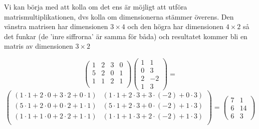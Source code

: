 \documentclass[../../main.tex]{subfiles}
\begin{document}
\begin{solution}{14} 

Vi kan börja med att kolla om det ens är möjligt att utföra matrismultiplikationen, dvs kolla om dimensionerna stämmer överens. Den vänstra matrisen har dimensionen $3\times4$ och den högra har dimensionen $4\times2$ så det funkar (de 'inre siffrorna' är samma för båda) och resultatet kommer bli en matris av dimensionen $3\times2$

$$
\begin{pmatrix}
1 & 2 & 3 & 0\\
5 & 2 & 0 & 1\\
1 & 1 & 2 & 1\\
\end{pmatrix} \begin{pmatrix}
1 & 1\\
0 & 3\\
2 & -2\\
1 & 3
\end{pmatrix}
=
$$
$$
\begin{pmatrix}
(1\cdot1 + 2\cdot0 + 3\cdot2 + 0\cdot 1) & (1\cdot1 + 2\cdot3 + 3\cdot(-2) + 0\cdot3)\\
(5\cdot1 + 2\cdot0 + 0\cdot2 + 1\cdot1) & (5\cdot1 + 2\cdot3 + 0\cdot(-2) + 1\cdot3)\\
(1\cdot1 + 1\cdot0 + 2\cdot2 + 1\cdot1) & (1\cdot1 + 1\cdot3 + 2\cdot(-2) + 1\cdot3) \\
\end{pmatrix}
= \begin{pmatrix}
7 & 1\\
6 & 14\\
6 & 3
\end{pmatrix}
$$

\end{solution}
\end{document}
